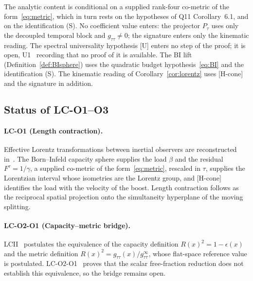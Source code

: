 \documentclass[11pt,a4paper]{article}
\begin{document}
      \medskip
      The analytic content is conditional on a supplied rank-four co-metric of the form~\eqref{eq:metric}, which in
      turn rests on the hypotheses of Q11 Corollary~6.1, and on the identification (S).
      No coefficient value enters: the projector $P_\tau$ uses only the decoupled temporal block and
      $g_{\tau\tau} \neq 0$; the signature enters only the kinematic reading.
      The spectral universality hypothesis [U] enters no step of the proof; it is open, U1~\cite{Beau2026u1}
      recording that no proof of it is available.
      The BI lift (Definition~\ref{def:BIsphere}) uses the quadratic budget hypothesis~\eqref{eq:BI} and the
      identification (S).
      The kinematic reading of Corollary~\ref{cor:lorentz} uses [H-cone] and the signature in addition.

    \subsection{Status of LC-O1--O3}

      \paragraph{LC-O1 (Length contraction).}
        Effective Lorentz transformations between inertial observers are reconstructed
        in~\cite{Beau2026lco1}.
        The Born--Infeld capacity sphere supplies the load $\beta$ and the residual
        $F^\tau = 1/\gamma$, a supplied co-metric of the form~\eqref{eq:metric}, rescaled in $\tau$, supplies the
        Lorentzian interval whose isometries are the Lorentz group, and [H-cone] identifies the load with the
        velocity of the boost.
        Length contraction follows as the reciprocal spatial projection onto the
        simultaneity hyperplane of the moving splitting.

      \paragraph{LC-O2-O1 (Capacity--metric bridge).}
        LCII~\cite{Beau2026lco2} postulates the equivalence of the capacity definition
        $R(x)^2 = 1-\epsilon(x)$ and the metric definition $R(x)^2 = g_{\tau\tau}(x)/g_{\tau\tau}^\infty$, whose
        flat-space reference value is postulated.
        LC-O2-O1~\cite{Beau2026lco2o1} proves that the scalar free-fraction reduction does
        not establish this equivalence, so the bridge remains open.
\end{document}
